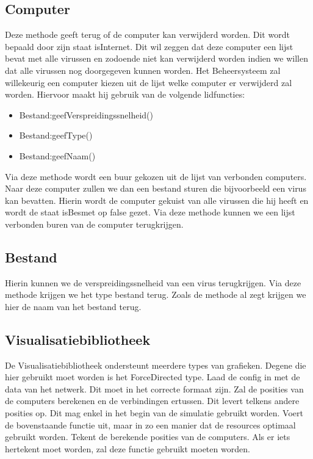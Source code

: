 \documentclass[a4paper,oneside]{report}
\begin{document}
\subsection{Computer}
 Deze methode geeft terug of de computer kan verwijderd worden. Dit wordt bepaald door zijn staat isInternet. Dit wil zeggen dat deze computer een lijst bevat met alle virussen en zodoende niet kan verwijderd worden indien we willen dat alle virussen nog doorgegeven kunnen worden.
 Het Beheersysteem zal willekeurig een computer kiezen uit de lijst welke computer er verwijderd zal worden. Hiervoor maakt hij gebruik van de volgende lidfuncties:
\begin{itemize}
    \item Bestand:geefVerspreidingssnelheid()
    \item Bestand:geefType()
    \item Bestand:geefNaam()
\end{itemize}
 Via deze methode wordt een buur gekozen uit de lijst van verbonden computers. Naar deze computer zullen we dan een bestand sturen die bijvoorbeeld een virus kan bevatten.
 Hierin wordt de computer gekuist van alle virussen die hij heeft en wordt de staat isBesmet op false gezet.
 Via deze methode kunnen we een lijst verbonden buren van de computer terugkrijgen.
\subsection{Bestand}
 Hierin kunnen we de verspreidingssnelheid van een virus terugkrijgen.
 Via deze methode krijgen we het type bestand terug.
 Zoals de methode al zegt krijgen we hier de naam van het bestand terug.
\subsection{Visualisatiebibliotheek}
 De Visualisatiebibliotheek ondersteunt meerdere types van grafieken. Degene die hier gebruikt moet worden is het ForceDirected type.
 Laad de config in met de data van het netwerk. Dit moet in het correcte formaat zijn.
 Zal de posities van de computers berekenen en de verbindingen ertussen. Dit levert telkens andere posities op. Dit mag enkel in het begin van de simulatie gebruikt worden.
 Voert de bovenstaande functie uit, maar in zo een manier dat de resources optimaal gebruikt worden.
 Tekent de berekende posities van de computers. Als er iets hertekent moet worden, zal deze functie gebruikt moeten worden.
\end{document}
